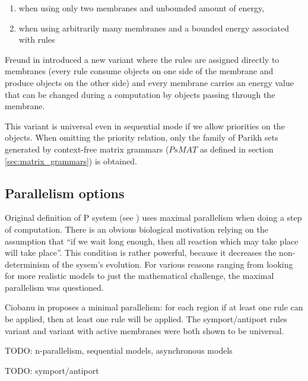 \begin{enumerate}
	\item when using only two membranes and unbounded amount of energy,
	\item when using arbitrarily many membranes and a bounded energy associated with rules
\end{enumerate}

Freund in \cite{Freund:2004:SequentialEnergy} introduced a new variant where the rules are assigned directly to membranes (every rule consume objects on one side of the membrane and produce objects on the other side) and every membrane carries an energy value that can be changed during a computation by objects passing through the membrane.

This variant is universal even in sequential mode if we allow priorities on the objects. When omitting the priority relation, only the family of Parikh sets generated by context-free matrix grammars ($PsMAT$ as defined in section \ref{sec:matrix_grammars}) is obtained.


\subsection{Parallelism options} %
\label{sub:parallelism_options}

Original definition of P system (see \cite{Paun98}) uses maximal parallelism when doing a step of computation. There is an obvious biological motivation relying on the assumption that ``if we wait long enough, then all reaction which may take place will take place''. This condition is rather powerful, because it decreases the non-determinism of the sysem's evolution. For various reasons ranging from looking for more realistic models to just the mathematical challenge, the maximal parallelism was questioned.

Ciobanu in \cite{Ciobanu:2007:MinimalParallelism} proposes a minimal parallelism: for each region if at least one rule can be applied, then at least one rule will be applied. The symport/antiport rules variant and variant with active membranes were both shown to be universal.

TODO: n-parallelism, sequential models, asynchronous models

TODO: symport/antiport

